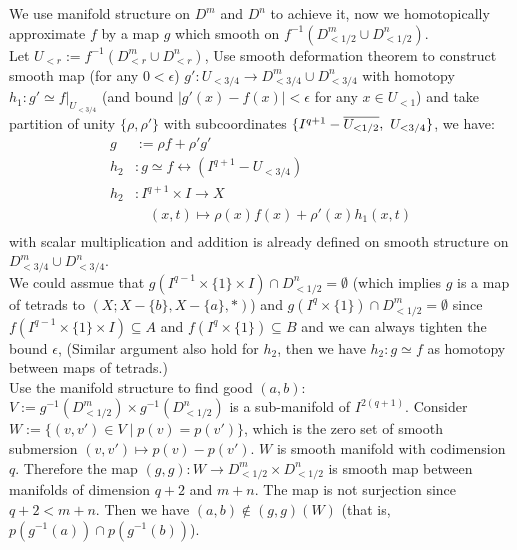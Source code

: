 \begin{prf}
        We use manifold structure on $D^m$ and $D^n$ to achieve it,
        now we homotopically approximate $f$ by a map $g$ which 
        smooth on $f^{-1}(D^m_{<1/2} \cup D^n_{<1/2})$.\\

        Let $U_{<r} := f^{-1}(D^m_{<r} \cup D^n_{<r})$,
        Use smooth deformation theorem to construct smooth map (for any $0 < \epsilon$)
        $g' : U_{<3/4} \to D^m_{<3/4} \cup D^n_{<3/4}$ with homotopy
        $h_1 : g' \simeq f|_{U_{<3/4}}$ (and bound $|g'(x) - f(x)| < \epsilon$ for any $x \in U_{<1}$)
        and take partition of unity
        $\{\rho, \rho'\}$ with subcoordinates $\{I^{q+1} - \overline{U_{<1/2}},\ U_{<3/4}\}$,
        we have:
        \begin{align*}
            g & := \rho f + \rho' g' \\
            h_2 & : g \simeq f \rel (I^{q+1} - U_{<3/4}) \\
            h_2 & : I^{q+1} \times I \to X\\
            & \quad (x,t) \mapsto \rho(x)f(x) + \rho'(x)h_1(x,t)\\
        \end{align*}
        with scalar multiplication and addition is already defined on smooth structure on $D^m_{<3/4} \cup D^n_{<3/4}$.\\
        We could assmue that $g(I^{q-1} \times \{1\} \times I) \cap D^n_{<1/2} = \emptyset$
        (which implies $g$ is a map of tetrads to $(X;X-\{b\},X-\{a\},\ast)$)
        and $g(I^{q} \times \{1\}) \cap D^m_{<1/2} = \emptyset$
        since $f(I^{q-1} \times \{1\} \times I) \subseteq A$ and $f(I^q\times \{1\}) \subseteq B$
        and we can always tighten the bound $\epsilon$,
        (Similar argument also hold for $h_2$,
        then we have $h_2 : g \simeq f$ as homotopy between maps of tetrads.)\\

        Use the manifold structure to find good $(a,b)$:\\
        $V := g^{-1}(D^m_{<1/2}) \times g^{-1}(D^n_{<1/2})$
        is a sub-manifold of $I^{2(q+1)}$.
        Consider $W := \{ (v,v') \in V \mid p(v)=p(v') \}$,
        which is the zero set of smooth submersion
        $(v,v') \mapsto p(v) - p(v')$.
        $W$ is smooth manifold with codimension $q$.
        Therefore the map $(g,g) : W \to D^m_{<1/2} \times D^n_{<1/2}$
        is smooth map between manifolds of dimension $q+2$ and $m+n$.
        The map is not surjection since $q+2 < m+n$.
        Then we have $(a,b) \notin (g,g)(W)$
        (that is, $p(g^{-1}(a)) \cap p(g^{-1}(b))$).\\


\end{prf}
